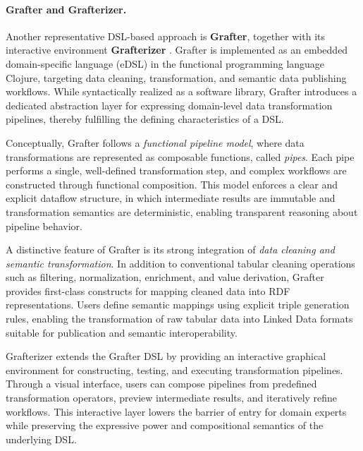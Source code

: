 

\paragraph{Grafter and Grafterizer.}
Another representative DSL-based approach is \textbf{Grafter}, together with its interactive environment \textbf{Grafterizer} \cite{grafterizer}. 
Grafter is implemented as an embedded domain-specific language (eDSL) in the functional programming language Clojure, targeting data cleaning, transformation, and semantic data publishing workflows. 
While syntactically realized as a software library, Grafter introduces a dedicated abstraction layer for expressing domain-level data transformation pipelines, thereby fulfilling the defining characteristics of a DSL.

Conceptually, Grafter follows a \emph{functional pipeline model}, where data transformations are represented as composable functions, called \emph{pipes}. 
Each pipe performs a single, well-defined transformation step, and complex workflows are constructed through functional composition. 
This model enforces a clear and explicit dataflow structure, in which intermediate results are immutable and transformation semantics are deterministic, enabling transparent reasoning about pipeline behavior.

A distinctive feature of Grafter is its strong integration of \emph{data cleaning and semantic transformation}. 
In addition to conventional tabular cleaning operations such as filtering, normalization, enrichment, and value derivation, Grafter provides first-class constructs for mapping cleaned data into RDF representations. 
Users define semantic mappings using explicit triple generation rules, enabling the transformation of raw tabular data into Linked Data formats suitable for publication and semantic interoperability.

Grafterizer extends the Grafter DSL by providing an interactive graphical environment for constructing, testing, and executing transformation pipelines. 
Through a visual interface, users can compose pipelines from predefined transformation operators, preview intermediate results, and iteratively refine workflows. 
This interactive layer lowers the barrier of entry for domain experts while preserving the expressive power and compositional semantics of the underlying DSL.

